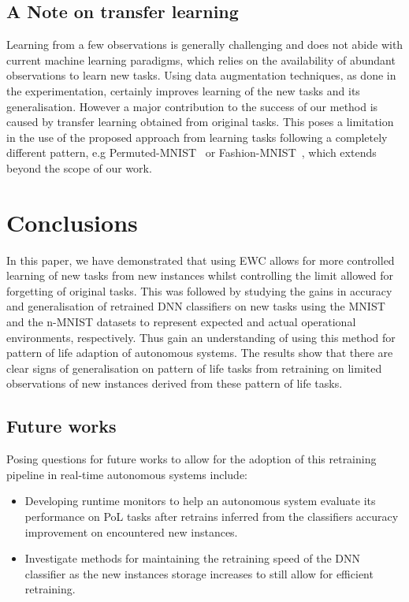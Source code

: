 \subsection{A Note on transfer learning}
Learning from a few observations is
generally challenging and does not abide with current machine learning paradigms, which relies on the availability of abundant observations to learn new tasks. 
%
Using data augmentation techniques, as done in the experimentation, certainly improves learning of the new tasks and its generalisation. 
%
However a major contribution to the success of our method is caused by transfer learning obtained from original tasks. 
%
This poses a limitation in the use of the proposed approach from learning tasks following a completely different pattern, e.g Permuted-MNIST~\cite{Goodfellow2014} or Fashion-MNIST~\cite{Xiao2017}, which extends beyond the scope of our work.


\section{Conclusions}\label{sec:conclusions}
In this paper, we have demonstrated that using  EWC allows for more controlled learning of new tasks from new instances whilst controlling the limit allowed for forgetting of original tasks.
This was followed by studying the gains in accuracy and generalisation of retrained DNN classifiers on new tasks using the MNIST and the n-MNIST datasets to represent expected and actual operational environments, respectively. 
%
Thus gain an understanding of using this method for pattern of life adaption of autonomous systems. 
%
The results show that there are clear signs of generalisation on pattern of life tasks from retraining on limited observations of new instances derived from these pattern of life tasks.
%
\subsection{Future works}\label{sec:future_works}
Posing questions for future works to allow for the adoption of this retraining pipeline in real-time autonomous systems include:
\begin{itemize}
    \item Developing runtime monitors to help an autonomous system evaluate its performance on PoL tasks after retrains inferred from the classifiers accuracy improvement on encountered new instances.
%
   \item Investigate methods for maintaining the retraining speed of the DNN classifier as the new instances storage increases to still allow for efficient retraining.
   
\end{itemize}

